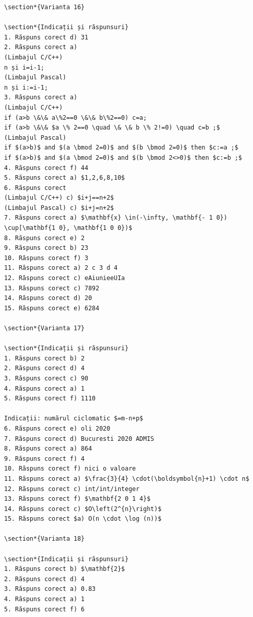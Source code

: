 \documentclass[10pt]{article}
\begin{document}
\begin{verbatim}
\section*{Varianta 16}

\section*{Indicații și răspunsuri}
1. Răspuns corect d) 31
2. Răspuns corect a)
(Limbajul C/C++)
n și i=i-1;
(Limbajul Pascal)
n și i:=i-1;
3. Răspuns corect a)
(Limbajul C/C++)
if (a>b \&\& a\%2==0 \&\& b\%2==0) c=a;
if (a>b \&\& $a \% 2==0 \quad \& \& b \% 2!=0) \quad c=b ;$
(Limbajul Pascal)
if $(a>b)$ and $(a \bmod 2=0)$ and $(b \bmod 2=0)$ then $c:=a ;$
if $(a>b)$ and $(a \bmod 2=0)$ and $(b \bmod 2<>0)$ then $c:=b ;$
4. Răspuns corect f) 44
5. Răspuns corect a) $1,2,6,8,10$
6. Răspuns corect
(Limbajul C/C++) c) $i+j==n+2$
(Limbajul Pascal) c) $i+j=n+2$
7. Răspuns corect a) $\mathbf{x} \in(-\infty, \mathbf{- 1 0}) \cup[\mathbf{1 0}, \mathbf{1 0 0})$
8. Răspuns corect e) 2
9. Răspuns corect b) 23
10. Răspuns corect f) 3
11. Răspuns corect a) 2 c 3 d 4
12. Răspuns corect c) eAiunieeUIa
13. Răspuns corect c) 7892
14. Răspuns corect d) 20
15. Răspuns corect e) 6284

\section*{Varianta 17}

\section*{Indicații și răspunsuri}
1. Răspuns corect b) 2
2. Răspuns corect d) 4
3. Răspuns corect c) 90
4. Răspuns corect a) 1
5. Răspuns corect f) 1110

Indicații: numărul ciclomatic $=m-n+p$
6. Răspuns corect e) oli 2020
7. Răspuns corect d) Bucuresti 2020 ADMIS
8. Răspuns corect a) 864
9. Răspuns corect f) 4
10. Răspuns corect f) nici o valoare
11. Răspuns corect a) $\frac{3}{4} \cdot(\boldsymbol{n}+1) \cdot n$
12. Răspuns corect c) int/int/integer
13. Răspuns corect f) $\mathbf{2 0 1 4}$
14. Răspuns corect c) $O\left(2^{n}\right)$
15. Răspuns corect $a) O(n \cdot \log (n))$

\section*{Varianta 18}

\section*{Indicații și răspunsuri}
1. Răspuns corect b) $\mathbf{2}$
2. Răspuns corect d) 4
3. Răspuns corect a) 0.83
4. Răspuns corect a) 1
5. Răspuns corect f) 6


\end{verbatim}
\end{document}
